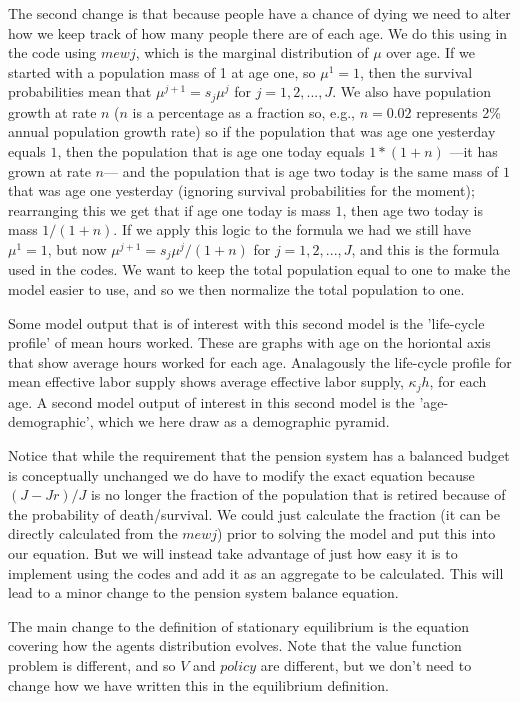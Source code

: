 The second change is that because people have a chance of dying we need to alter how we keep track of how many people there are of each age. We do this using in the code using $mewj$, which is the marginal distribution of $\mu$ over age. If we started with a population mass of 1 at age one, so $\mu^1=1$, then the survival probabilities mean that  $\mu^{j+1}=s_j \mu^j$ for $j=1,2,...,J$. We also have population growth at rate $n$ ($n$ is a percentage as a fraction so, e.g., $n=0.02$ represents 2\% annual population growth rate) so if the population that was age one yesterday equals $1$, then the population that is age one today equals $1*(1+n)$ ---it has grown at rate $n$--- and the population that is age two today is the same mass of $1$ that was age one yesterday (ignoring survival probabilities for the moment); rearranging this we get that if age one today is mass $1$, then age two today is mass $1/(1+n)$. If we apply this logic to the formula we had we still have $\mu^1=1$, but now $\mu^{j+1}=s_j \mu^j/(1+n)$ for $j=1,2,...,J$, and this is the formula used in the codes. We want to keep the total population equal to one to make the model easier to use, and so we then normalize the total population to one.

Some model output that is of interest with this second model is the 'life-cycle profile' of mean hours worked. These are graphs with age on the horiontal axis that show average hours worked for each age. Analagously the life-cycle profile for mean effective labor supply shows average effective labor supply, $\kappa_j h$, for each age. A second model output of interest in this second model is the 'age-demographic', which we here draw as a demographic pyramid.

Notice that while the requirement that the pension system has a balanced budget is conceptually unchanged we do have to modify the exact equation because $(J-Jr)/J$ is no longer the fraction of the population that is retired because of the probability of death/survival. We could just calculate the fraction (it can be directly calculated from the $mewj$) prior to solving the model and put this into our equation. But we will instead take advantage of just how easy it is to implement using the codes and add it as an aggregate to be calculated. This will lead to a minor change to the pension system balance equation.

The main change to the definition of stationary equilibrium is the equation covering how the agents distribution evolves. Note that the value function problem is different, and so $V$ and $policy$ are different, but we don't need to change how we have written this in the equilibrium definition.

